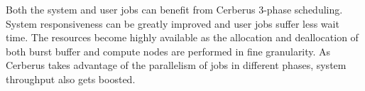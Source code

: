 Both the system and user jobs can benefit from Cerberus 3-phase scheduling.
System responsiveness can be greatly improved and
user jobs suffer less wait time. 
The resources become highly available as the allocation and deallocation of
both burst buffer and compute nodes are performed in fine granularity. 
As Cerberus takes advantage of the parallelism of jobs in different phases,
system throughput also gets boosted.

